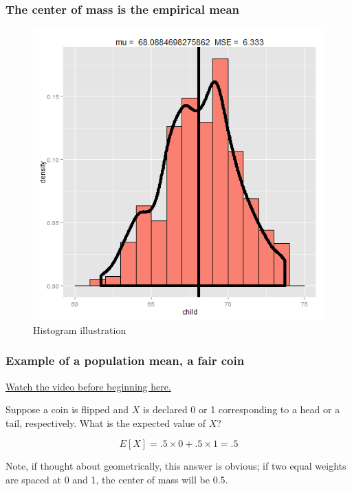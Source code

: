 \documentclass[]{article}
\begin{document}
\subsubsection{The center of mass is the empirical
mean}\label{the-center-of-mass-is-the-empirical-mean}

\begin{figure}[htbp]
\centering
\includegraphics{LeanPub/images/lsm-1.png}
\caption{Histogram illustration}
\end{figure}

\subsubsection{Example of a population mean, a fair
coin}\label{example-of-a-population-mean-a-fair-coin}

\href{http://youtu.be/F4XMuD_axN8?list=PLpl-gQkQivXiBmGyzLrUjzsblmQsLtkzJ}{Watch
the video before beginning here.}

Suppose a coin is flipped and $X$ is declared 0 or 1 corresponding to a
head or a tail, respectively. What is the expected value of $X$?

\[
E[X] = .5 \times 0 + .5 \times 1 = .5
\]

Note, if thought about geometrically, this answer is obvious; if two
equal weights are spaced at 0 and 1, the center of mass will be 0.5.
\end{document}

